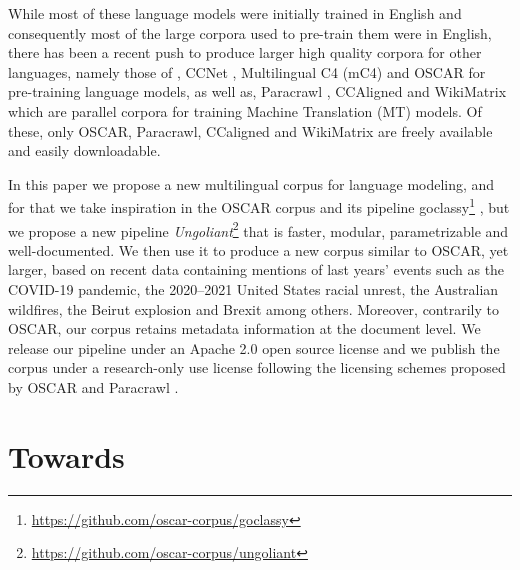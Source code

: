 While most of these language models were initially trained in English \citep{devlin-etal-2019-bert,yang-etal-2019-xlnet,clark-etal-2020-electra,zaheer-etal-2020-big,xiong-etal-2021-nystromformer} and consequently most of the large corpora used to pre-train them were in English, there has been a recent push to produce larger high quality corpora for other languages, namely those of \citet{grave-etal-2018-learning}, CCNet \citep{wenzek-etal-2020-ccnet}, Multilingual C4 (mC4) \citep{xue-etal-2021-mt5} and OSCAR \citep{ortiz-suarez-etal-2019-asynchronous,ortiz-suarez-etal-2020-monolingual} for pre-training language models, as well as, Paracrawl \citep{espla-etal-2019-paracrawl,banon-etal-2020-paracrawl}, CCAligned \citep{el-kishky-etal-2020-ccaligned} and WikiMatrix \citep{schwenk-etal-2021-wikimatrix} which are parallel corpora for training Machine Translation (MT) models. Of these, only OSCAR, Paracrawl, CCaligned and WikiMatrix are freely available and easily downloadable.

In this paper we propose a new multilingual corpus for language modeling, and for that we take inspiration in the OSCAR corpus and its pipeline goclassy\footnote{\url{https://github.com/oscar-corpus/goclassy}} \citep{ortiz-suarez-etal-2019-asynchronous,ortiz-suarez-etal-2020-monolingual}, but we propose a new pipeline \emph{Ungoliant}\footnote{\url{https://github.com/oscar-corpus/ungoliant}} that is faster, modular, parametrizable and well-documented. We then use it to produce a new corpus similar to OSCAR, yet larger, based on recent data containing mentions of last years' events such as the COVID-19 pandemic, the 2020–2021 United States racial unrest, the Australian wildfires, the Beirut explosion and Brexit among others. Moreover, contrarily to OSCAR, our corpus retains metadata information at the document level. We release our pipeline under an Apache 2.0 open source license and we publish the corpus under a research-only use license following the licensing schemes proposed by OSCAR \citep{ortiz-suarez-etal-2019-asynchronous,ortiz-suarez-etal-2020-monolingual} and Paracrawl \citep{espla-etal-2019-paracrawl,banon-etal-2020-paracrawl}.

\section{Towards}

